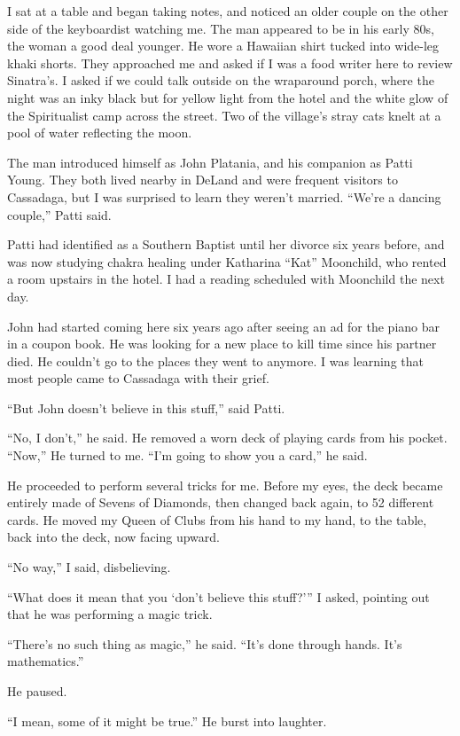 I sat at a table and began taking notes, and noticed an older couple on
the other side of the keyboardist watching me. The man appeared to be in
his early 80s, the woman a good deal younger. He wore a Hawaiian shirt
tucked into wide-leg khaki shorts. They approached me and asked if I was
a food writer here to review Sinatra's. I asked if we could talk outside
on the wraparound porch, where the night was an inky black but for
yellow light from the hotel and the white glow of the Spiritualist camp
across the street. Two of the village's stray cats knelt at a pool of
water reflecting the moon.

The man introduced himself as John Platania, and his companion as Patti
Young. They both lived nearby in DeLand and were frequent visitors to
Cassadaga, but I was surprised to learn they weren't married. ``We're a
dancing couple,'' Patti said.

Patti had identified as a Southern Baptist until her divorce six years
before, and was now studying chakra healing under Katharina ``Kat''
Moonchild, who rented a room upstairs in the hotel. I had a reading
scheduled with Moonchild the next day.

John had started coming here six years ago after seeing an ad for the
piano bar in a coupon book. He was looking for a new place to kill time
since his partner died. He couldn't go to the places they went to
anymore. I was learning that most people came to Cassadaga with their
grief.

``But John doesn't believe in this stuff,'' said Patti.

``No, I don't,'' he said. He removed a worn deck of playing cards from
his pocket. ``Now,'' He turned to me. ``I'm going to show you a card,''
he said.

He proceeded to perform several tricks for me. Before my eyes, the deck
became entirely made of Sevens of Diamonds, then changed back again, to
52 different cards. He moved my Queen of Clubs from his hand to my hand,
to the table, back into the deck, now facing upward.

``No way,'' I said, disbelieving.

``What does it mean that you `don't believe this stuff?''' I asked,
pointing out that he was performing a magic trick.

``There's no such thing as magic,'' he said. ``It's done through hands.
It's mathematics.''

He paused.

``I mean, some of it might be true.'' He burst into laughter.

